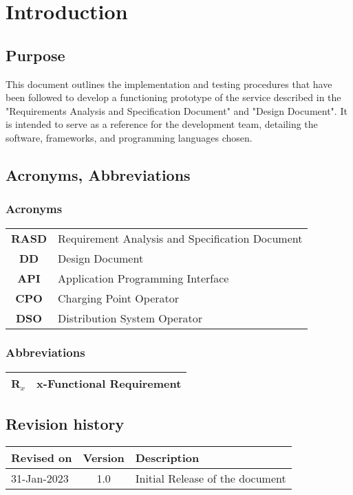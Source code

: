 \section{Introduction}
\subsection{Purpose}
This document outlines the implementation and testing procedures that have been followed to develop a functioning prototype of the service described in the "Requirements Analysis and Specification Document" and "Design Document".
It is intended to serve as a reference for the development team, detailing the software, frameworks, and programming languages chosen.
\subsection{Acronyms, Abbreviations}
\subsubsection{Acronyms}
\begin{table}[H]
    \begin{tabularx}{\textwidth}{cX}
        \toprule
        \textbf{RASD} & Requirement Analysis and Specification Document \\
        \textbf{DD}   & Design Document                                 \\
        \textbf{API}  & Application Programming Interface               \\
        \textbf{CPO}  & Charging Point Operator                          \\
        \textbf{DSO}  & Distribution System Operator                     \\
        \bottomrule
    \end{tabularx}
\end{table}
\subsubsection{Abbreviations}
\begin{table}[H]
    \begin{tabularx}{\textwidth}{cX}
        \toprule
        \textbf{R$_x$} & x-Functional Requirement \\
        \bottomrule
    \end{tabularx}
\end{table}
\subsection{Revision history}
\begin{table}[H]
    \begin{tabularx}{\textwidth}{lcl}
        \toprule
        \textbf{Revised on} & Version & Description                     \\ \midrule
        31-Jan-2023         & 1.0     & Initial Release of the document \\
        \bottomrule
    \end{tabularx}
\end{table}
